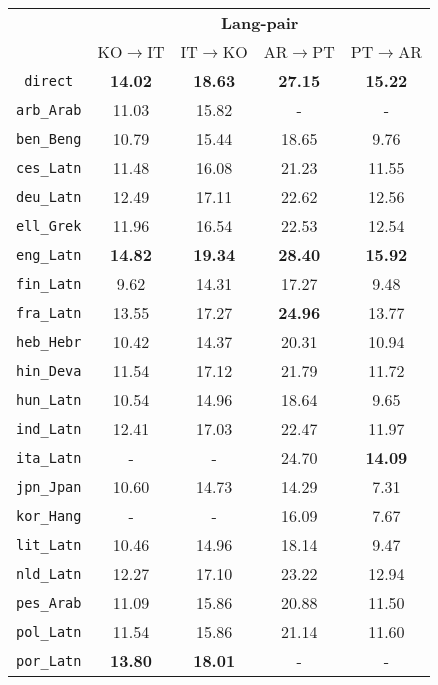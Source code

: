 \begin{table}[h]
\centering
\small
\renewcommand{\arraystretch}{0.96}
\begin{adjustbox}{width=\columnwidth, center}
\begin{tabular}{ccccc}
\Xhline{3\arrayrulewidth}

\multirow{2}{*}{\textbf{Pivot Language}} & \multicolumn{4}{c}{\textbf{Lang-pair}} \\ \cline{2-5} 
 & KO$\rightarrow$IT& IT$\rightarrow$KO & AR$\rightarrow$PT & PT$\rightarrow$AR \\ \hline\hline 

\texttt{direct}    & \textbf{14.02}& \textbf{18.63} & \textbf{27.15} & \textbf{15.22} \\
\texttt{arb\_Arab} & 11.03 & 15.82 & - & - \\
\texttt{ben\_Beng} & 10.79 & 15.44 & 18.65 & 9.76 \\
\texttt{ces\_Latn} & 11.48 & 16.08 & 21.23 & 11.55 \\
\texttt{deu\_Latn} & 12.49 & 17.11 & 22.62 & 12.56 \\
\texttt{ell\_Grek} & 11.96 & 16.54 & 22.53 & 12.54 \\
\texttt{eng\_Latn} & \textbf{14.82} & \textbf{19.34} & \textbf{28.40} & \textbf{15.92} \\
\texttt{fin\_Latn} & 9.62 & 14.31 & 17.27 & 9.48 \\
\texttt{fra\_Latn} & 13.55 & 17.27 & \textbf{24.96} & 13.77 \\
\texttt{heb\_Hebr} & 10.42 & 14.37 & 20.31 & 10.94 \\
\texttt{hin\_Deva} & 11.54 & 17.12 & 21.79 & 11.72 \\
\texttt{hun\_Latn} & 10.54 & 14.96 & 18.64 & 9.65 \\
\texttt{ind\_Latn} & 12.41 & 17.03 & 22.47 & 11.97 \\
\texttt{ita\_Latn} & - & - & 24.70 & \textbf{14.09} \\
\texttt{jpn\_Jpan} & 10.60 & 14.73 & 14.29 & 7.31 \\
\texttt{kor\_Hang} & - & - & 16.09 & 7.67 \\
\texttt{lit\_Latn} & 10.46 & 14.96 & 18.14 & 9.47 \\
\texttt{nld\_Latn} & 12.27 & 17.10 & 23.22 & 12.94 \\
\texttt{pes\_Arab} & 11.09 & 15.86 & 20.88 & 11.50 \\
\texttt{pol\_Latn} & 11.54 & 15.86 & 21.14 & 11.60 \\
\texttt{por\_Latn} & \textbf{13.80} & \textbf{18.01} & - & - \\

\end{tabular}
\end{adjustbox}
\end{table}
